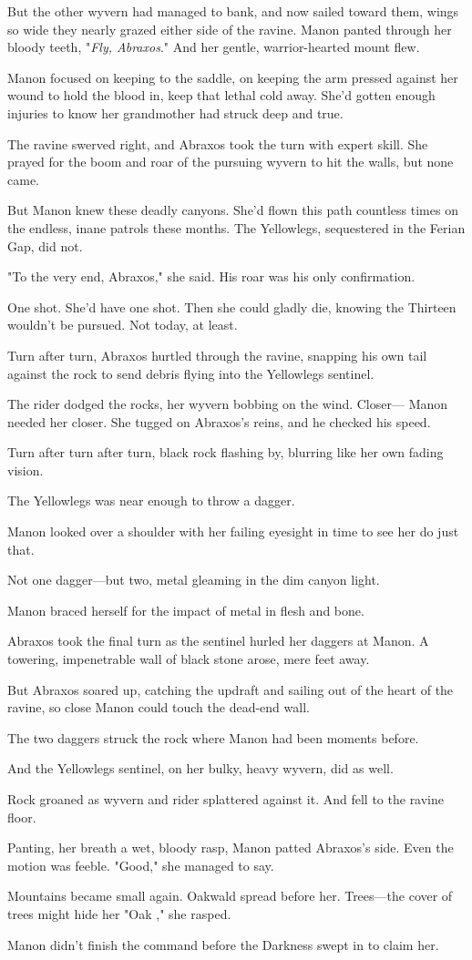 But the other wyvern had managed to bank, and now sailed toward them, wings so wide they nearly grazed either side of the ravine. Manon panted through her bloody teeth, "\emph{Fly, Abraxos}." And her gentle, warrior-hearted mount flew.

Manon focused on keeping to the saddle, on keeping the arm pressed against her wound to hold the blood in, keep that lethal cold away. She'd gotten enough injuries to know her grandmother had struck deep and true.

The ravine swerved right, and Abraxos took the turn with expert skill. She prayed for the boom and roar of the pursuing wyvern to hit the walls, but none came.

But Manon knew these deadly canyons. She'd flown this path countless times on the endless, inane patrols these months. The Yellowlegs, sequestered in the Ferian Gap, did not.

"To the very end, Abraxos," she said. His roar was his only confirmation.

One shot. She'd have one shot. Then she could gladly die, knowing the Thirteen wouldn't be pursued. Not today, at least.

Turn after turn, Abraxos hurtled through the ravine, snapping his own tail against the rock to send debris flying into the Yellowlegs sentinel.

The rider dodged the rocks, her wyvern bobbing on the wind. Closer--- Manon needed her closer. She tugged on Abraxos's reins, and he checked his speed.

Turn after turn after turn, black rock flashing by, blurring like her own fading vision.

The Yellowlegs was near enough to throw a dagger.

Manon looked over a shoulder with her failing eyesight in time to see her do just that.

Not one dagger---but two, metal gleaming in the dim canyon light.

Manon braced herself for the impact of metal in flesh and bone.

Abraxos took the final turn as the sentinel hurled her daggers at Manon. A towering, impenetrable wall of black stone arose, mere feet away.

But Abraxos soared up, catching the updraft and sailing out of the heart of the ravine, so close Manon could touch the dead-end wall.

The two daggers struck the rock where Manon had been moments before.

And the Yellowlegs sentinel, on her bulky, heavy wyvern, did as well.

Rock groaned as wyvern and rider splattered against it. And fell to the ravine floor.

Panting, her breath a wet, bloody rasp, Manon patted Abraxos's side. Even the motion was feeble. "Good," she managed to say.

Mountains became small again. Oakwald spread before her. Trees---the cover of trees might hide her  "Oak  ," she rasped.

Manon didn't finish the command before the Darkness swept in to claim her.

